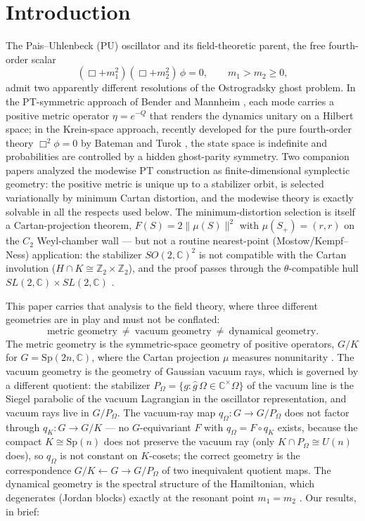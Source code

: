 \documentclass[11pt]{article}
\theoremstyle{definition}
\theoremstyle{remark}
\newcommand{\C}{\mathbb{C}}
\newcommand{\Z}{\mathbb{Z}}
\newcommand{\Sp}{\mathrm{Sp}}
\begin{document}
\section{Introduction}\label{sec:intro}

The Pais--Uhlenbeck (PU) oscillator and its field-theoretic parent, the
free fourth-order scalar
\begin{equation}\label{eq:eom}
(\Box+m_1^2)(\Box+m_2^2)\,\phi=0,\qquad m_1>m_2\ge0,
\end{equation}
admit two apparently different resolutions of the Ostrogradsky ghost
problem.  In the PT-symmetric approach of Bender and Mannheim
\cite{BM2008PRL,BM2008PRD}, each mode carries a positive metric operator
$\eta=e^{-Q}$ that renders the dynamics unitary on a Hilbert space; in the
Krein-space approach, recently developed for the pure fourth-order theory
$\Box^2\phi=0$ by Bateman and Turok \cite{BT2026}, the state space is
indefinite and probabilities are controlled by a hidden ghost-parity
symmetry.  Two companion papers \cite{companion1,companion2} analyzed the
modewise PT construction as finite-dimensional symplectic geometry: the
positive metric is unique up to a stabilizer orbit, is selected
variationally by minimum Cartan distortion, and the modewise theory is
exactly solvable in all the respects used below.  The minimum-distortion
selection is itself a Cartan-projection theorem, $F(S)=2\|\mu(S)\|^2$
with $\mu(S_+)=(r,r)$ on the $C_2$ Weyl-chamber wall --- but not a
routine nearest-point (Mostow/Kempf--Ness) application: the stabilizer
$SO(2,\C)^2$ is not compatible with the Cartan involution
($H\cap K\cong\Z_2\times\Z_2$), and the proof passes through the
$\theta$-compatible hull $SL(2,\C)\times SL(2,\C)$ \cite{companion2}.

This paper carries that analysis to the field theory, where three
different geometries are in play and must not be conflated:
\begin{equation}\label{eq:threegeom}
\text{metric geometry}\ \neq\ \text{vacuum geometry}\ \neq\
\text{dynamical geometry}.
\end{equation}
The metric geometry is the symmetric-space geometry of positive operators,
$G/K$ for $G=\Sp(2n,\C)$, where the Cartan projection $\mu$ measures
nonunitarity \cite{companion2}.  The vacuum geometry is the geometry of
Gaussian vacuum rays, which is governed by a different quotient: the
stabilizer $P_\Omega=\{g:\hat g\,\Omega\in\C^\times\Omega\}$ of the
vacuum line is the Siegel parabolic of the vacuum Lagrangian in the
oscillator representation, and vacuum rays live in $G/P_\Omega$.  The
vacuum-ray map $q_\Omega:G\to G/P_\Omega$ does not factor through
$q_K:G\to G/K$ --- no $G$-equivariant $F$ with $q_\Omega=F\circ q_K$
exists, because the compact $K\cong\Sp(n)$ does not preserve the vacuum
ray (only $K\cap P_\Omega\cong U(n)$ does), so $q_\Omega$ is not
constant on $K$-cosets; the correct geometry is the correspondence
$G/K\leftarrow G\rightarrow G/P_\Omega$ of two inequivalent quotient
maps.  The dynamical geometry is the spectral structure of the
Hamiltonian, which degenerates (Jordan blocks) exactly at the resonant
point $m_1=m_2$ \cite{companion1}.  Our results, in brief:
\end{document}
